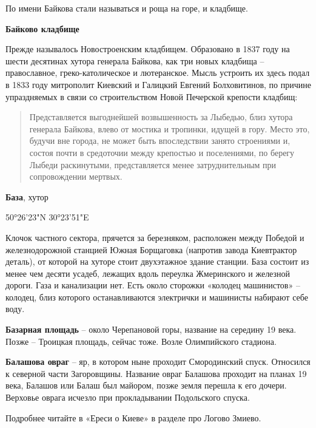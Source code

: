 По имени Байкова стали называться и роща на горе, и кладбище.\\

\medskip

\textbf{Байково кладбище}

Прежде называлось Новостроенским кладбищем. Образовано в 1837 году на шести десятинах хутора генерала Байкова, как три новых кладбища – православное, греко-католическое и лютеранское. Мысль устроить их здесь подал в 1833 году митрополит Киевский и Галицкий Евгений Болховитинов, по причине упраздняемых в связи со строительством Новой Печерской крепости кладбищ:

\begin{quotation}
Представляется выгоднейшей возвышенность за Лыбедью, близ хутора генерала Байкова, влево от мостика и тропинки, идущей в гору. Место это, будучи вне города, не может быть впоследствии занято строениями и, состоя почти в средоточии между крепостью и поселениями, по берегу Лыбеди раскинутыми, представляется менее затруднительным при сопровождении мертвых.
\end{quotation}


\medskip

\textbf{База}, хутор

50°26'23"N 30°23'51"E

Клочок частного сектора, прячется за березняком, расположен между Победой и железнодорожной станцией Южная Борщаговка (напротив завода Киевтрактор деталь), от которой на хуторе стоит двухэтажное здание станции. База состоит из менее чем десяти усадеб, лежащих вдоль переулка Жмеринского и железной дороги. Газа и канализации нет. Есть около сторожки «колодец машинистов» – колодец, близ которого останавливаются электрички и машинисты набирают себе воду.\\

\medskip


\textbf{Базарная площадь} – около Черепановой горы, название на середину 19 века. Позже – Троицкая площадь, сейчас тоже. Возле Олимпийского стадиона.\\

\medskip

\textbf{Балашова овраг} – яр, в котором ныне проходит Смородинский спуск. Относился к северной части Загоровщины. Название овраг Балашова проходит на планах 19 века, Балашов или Балаш был майором, позже земля перешла к его дочери. Верховье оврага исчезло при прокладывании Подольского спуска. 

Подробнее читайте в «Ереси о Киеве» в разделе про Логово Змиево.\\

